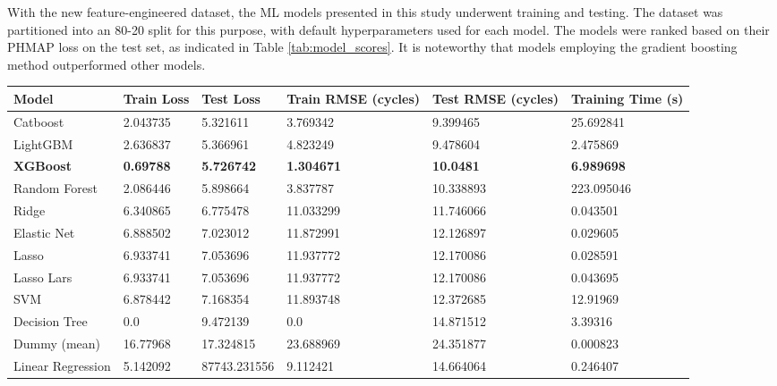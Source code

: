 \documentclass{IEEEtran}
\begin{document}
        With the new feature-engineered dataset, the ML models presented in this study underwent training and testing. The dataset was partitioned into an 80-20 split for this purpose, with default hyperparameters used for each model. The models were ranked based on their PHMAP loss on the test set, as indicated in Table \ref{tab:model_scores}. It is noteworthy that models employing the gradient boosting method outperformed other models.
        \begin{table*}[!htbp]
            \centering
            \caption{Train and Test metrics for the selected suite of ML models}
            \label{tab:model_scores}
            \begin{tabular}{llllll}
                \toprule
                Model & Train Loss & Test Loss & Train RMSE (cycles) & Test RMSE (cycles) & Training Time (s) \\
                \midrule
                Catboost & 2.043735 & 5.321611 & 3.769342 & 9.399465 & 25.692841 \\
                LightGBM & 2.636837 & 5.366961 & 4.823249 & 9.478604 & 2.475869 \\
                \textbf{XGBoost} & \textbf{0.69788} & \textbf{5.726742} & \textbf{1.304671} & \textbf{10.0481} & \textbf{6.989698} \\
                Random Forest & 2.086446 & 5.898664 & 3.837787 & 10.338893 & 223.095046 \\
                Ridge & 6.340865 & 6.775478 & 11.033299 & 11.746066 & 0.043501 \\
                Elastic Net & 6.888502 & 7.023012 & 11.872991 & 12.126897 & 0.029605 \\
                Lasso & 6.933741 & 7.053696 & 11.937772 & 12.170086 & 0.028591 \\
                Lasso Lars & 6.933741 & 7.053696 & 11.937772 & 12.170086 & 0.043695 \\
                SVM & 6.878442 & 7.168354 & 11.893748 & 12.372685 & 12.91969 \\
                Decision Tree & 0.0 & 9.472139 & 0.0 & 14.871512 & 3.39316 \\
                Dummy (mean) & 16.77968 & 17.324815 & 23.688969 & 24.351877 & 0.000823 \\
                Linear Regression & 5.142092 & 87743.231556 & 9.112421 & 14.664064 & 0.246407 \\
                \bottomrule
            \end{tabular}
        \end{table*}
\end{document}
